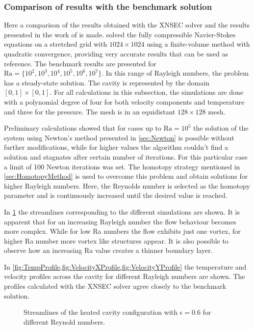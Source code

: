 \subsubsection{Comparison of results with the benchmark solution}

Here a comparison of the results obtained with the XNSEC solver and the results presented in the work of \textcite{vierendeelsBenchmarkSolutionsNatural2003} is made. \textcite{vierendeelsBenchmarkSolutionsNatural2003} solved the fully compressible Navier-Stokes equations on a stretched grid with $1024\times1024$ using a finite-volume method with quadratic convergence, providing very accurate results that can be used as reference.
The benchmark results are presented for $\text{Ra} = \{10^2,10^3,10^4,10^5,10^6,10^7\}$. In this range of Rayleigh numbers, the problem has a steady-state solution. 
The cavity is represented by the domain $[0,1]\times[0,1]$. For all calculations in this subsection, the simulations are done with a polynomial degree of four for both velocity components and temperature and three for the pressure. The mesh is in an equidistant $128\times128$ mesh.

Preliminary calculations showed that for cases up to $\text{Ra} = 10^5$ the solution of the system using Newton's method presented in \cref{sec:Newton} is possible without further modifications, while for higher values the algorithm couldn't find a solution and stagnates after certain number of iterations. For this particular case a limit of 100 Newton iterations was set. The homotopy strategy mentioned in \cref{sec:HomotopyMethod} is used to overcome this problem and obtain solutions for higher Rayleigh numbers. Here, the Reynolds number is selected as the homotopy parameter and is continuously increased until the desired value is reached.

In \cref{fig:HSCStreamlines} the streamlines corresponding to the different simulations are shown. It is apparent that for an increasing Rayleigh number the flow behaviour becomes more complex. While for low Ra numbers the flow exhibits just one vortex, for higher Ra number more vortex like structures appear. It is also possible to observe how an increasing Ra value creates a thinner boundary layer.

In \cref{fig:TempProfile,fig:VelocityXProfile,fig:VelocityYProfile} the temperature and velocity profiles across the cavity for different Rayleigh numbers are shown. The profiles calculated with the XNSEC solver agree closely to the benchmark solution.%
\begin{figure}[h]
	\centering
	\pgfplotsset{width=0.3 \textwidth, compat=1.3}
	\caption{Streamlines of the heated cavity configuration with $\epsilon = 0.6$ for different Reynold numbers.}\label{fig:HSCStreamlines}
\end{figure}


